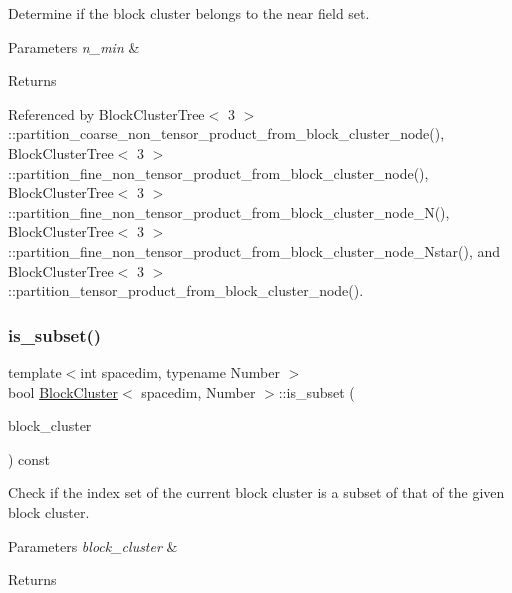 Determine if the block cluster belongs to the near field set. 
\begin{DoxyParams}{Parameters}
{\em n\+\_\+min} & \\
\hline
\end{DoxyParams}
\begin{DoxyReturn}{Returns}

\end{DoxyReturn}


Referenced by Block\+Cluster\+Tree$<$ 3 $>$\+::partition\+\_\+coarse\+\_\+non\+\_\+tensor\+\_\+product\+\_\+from\+\_\+block\+\_\+cluster\+\_\+node(), Block\+Cluster\+Tree$<$ 3 $>$\+::partition\+\_\+fine\+\_\+non\+\_\+tensor\+\_\+product\+\_\+from\+\_\+block\+\_\+cluster\+\_\+node(), Block\+Cluster\+Tree$<$ 3 $>$\+::partition\+\_\+fine\+\_\+non\+\_\+tensor\+\_\+product\+\_\+from\+\_\+block\+\_\+cluster\+\_\+node\+\_\+\+N(), Block\+Cluster\+Tree$<$ 3 $>$\+::partition\+\_\+fine\+\_\+non\+\_\+tensor\+\_\+product\+\_\+from\+\_\+block\+\_\+cluster\+\_\+node\+\_\+\+Nstar(), and Block\+Cluster\+Tree$<$ 3 $>$\+::partition\+\_\+tensor\+\_\+product\+\_\+from\+\_\+block\+\_\+cluster\+\_\+node().

\mbox{\label{classBlockCluster_af479a9471d056baa51a3f300bd0a5a27}} 
\subsubsection{\texorpdfstring{is\+\_\+subset()}{is\_subset()}}
{\footnotesize\ttfamily template$<$int spacedim, typename Number $>$ \\
bool \hyperlink{classBlockCluster}{Block\+Cluster}$<$ spacedim, Number $>$\+::is\+\_\+subset (\begin{DoxyParamCaption}\item[{const \hyperlink{classBlockCluster}{Block\+Cluster}$<$ spacedim, Number $>$ \&}]{block\+\_\+cluster }\end{DoxyParamCaption}) const}

Check if the index set of the current block cluster is a subset of that of the given block cluster. 
\begin{DoxyParams}{Parameters}
{\em block\+\_\+cluster} & \\
\hline
\end{DoxyParams}
\begin{DoxyReturn}{Returns}

\end{DoxyReturn}


